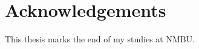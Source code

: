 \documentclass[class=book, crop=false, 11pt]{standalone}
\begin{document}
\chapter{Acknowledgements}
This thesis marks the end of my studies at NMBU.
\end{document}
